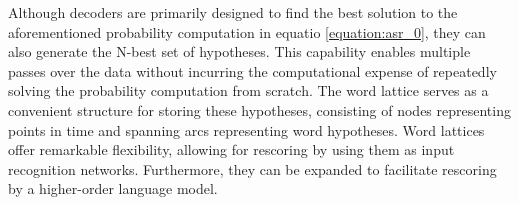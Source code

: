 Although decoders are primarily designed to find the best solution to the aforementioned probability computation in equatio \ref{equation:asr_0}, they can also generate the N-best set of hypotheses. This capability enables multiple passes over the data without incurring the computational expense of repeatedly solving the probability computation from scratch. The word lattice \cite{richardson1995lattice} serves as a convenient structure for storing these hypotheses, consisting of nodes representing points in time and spanning arcs representing word hypotheses.
Word lattices offer remarkable flexibility, allowing for rescoring by using them as input recognition networks. Furthermore, they can be expanded to facilitate rescoring by a higher-order language model.



\newpage
